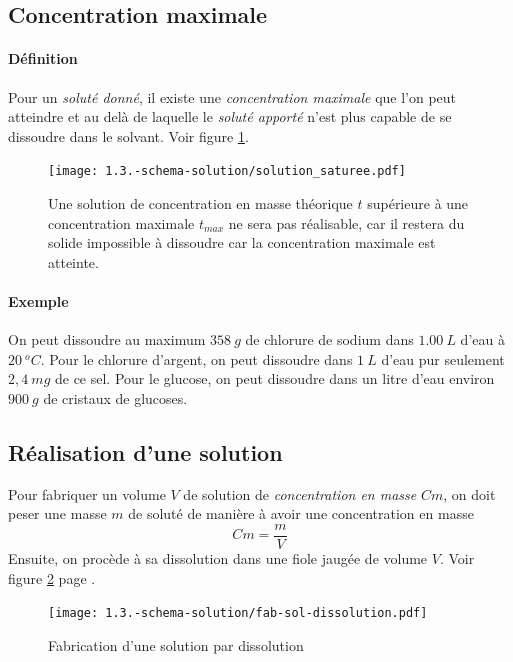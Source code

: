 \subsection{Concentration maximale}
\paragraph{Définition} Pour un \textit{soluté donné}, il existe une 
\textit{concentration maximale} que l'on peut atteindre et au delà de laquelle
le \textit{soluté apporté} n'est plus capable de se dissoudre dans le solvant. Voir figure \ref{fig:solution_saturee}.
\begin{figure}[h!]
  \begin{center}
      \texttt{[image: 1.3.-schema-solution/solution\_saturee.pdf]}
  \end{center}
  \caption{Une solution de concentration en masse théorique $t$ supérieure à une concentration maximale $t_{max}$ ne sera 
  pas réalisable, car il restera du solide impossible à dissoudre car la concentration maximale est atteinte.}
  \label{fig:solution_saturee}
\end{figure}

\paragraph{Exemple}
On peut dissoudre au maximum $358~g$ de chlorure de sodium dans $1.00~L$ d'eau à $20~{}^o C$. 
Pour le chlorure d'argent, on peut dissoudre dans $1~L$ d'eau pur seulement $2,4~mg$ de ce sel.
Pour le glucose, on peut dissoudre dans un litre d'eau environ $900~g$ de cristaux de glucoses.

\subsection{Réalisation d'une solution} Pour fabriquer un volume $V$
de solution de \textit{concentration en masse} $Cm$, on doit peser une masse $m$
de soluté de manière à avoir une concentration en masse $$Cm=\frac{m}{V}$$
Ensuite, on procède à sa dissolution dans une fiole jaugée de volume $V$.
Voir figure \ref{fig:fab-sol-dissolution} page \pageref{fig:fab-sol-dissolution}.

\begin{figure}[h!]
  \begin{center}
      \texttt{[image: 1.3.-schema-solution/fab-sol-dissolution.pdf]}
  \end{center}
  \caption{Fabrication d'une solution par dissolution}
  \label{fig:fab-sol-dissolution}
\end{figure}


